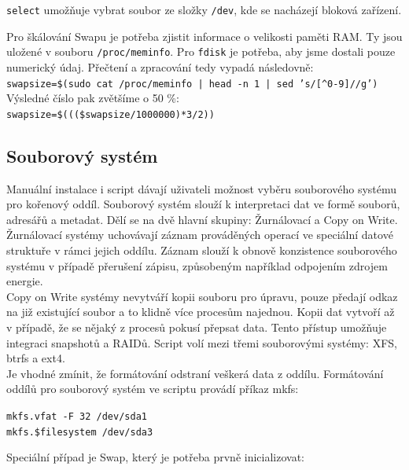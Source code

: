 \documentclass[12pt,a4paper,twoside,]{article}
\begin{document}
\texttt{select} umožňuje vybrat soubor ze složky \texttt{/dev}, kde se nacházejí bloková zařízení.
\newpage
{Pro škálování Swapu je potřeba zjistit informace o velikosti paměti RAM. Ty jsou uložené v souboru \texttt{/proc/meminfo}. Pro \texttt{fdisk} je potřeba, aby jsme dostali pouze numerický údaj. Přečtení a zpracování tedy vypadá následovně:\\
	
\texttt{swapsize=\$(sudo cat /proc/meminfo | head -n 1 | sed 's/[\^{}0-9]//g')}\\

\hspace*{-1.5em}Výsledné číslo pak zvětšíme o 50 \%:\\ 

\texttt{swapsize=\$(((\$swapsize/1000000)*3/2))}\\






\newpage
\subsection{\textsf{Souborový systém}}\hypertarget{Souborový systém}{}
Manuální instalace i script dávají uživateli možnost vyběru souborového systému pro kořenový oddíl.
Souborový systém slouží k interpretaci dat ve formě souborů, adresářů a metadat. Dělí se na dvě hlavní skupiny: Žurnálovací a Copy on Write.\\
Žurnálovací systémy uchovávají záznam prováděných operací ve speciální datové struktuře v rámci jejich oddílu. 
Záznam slouží k obnově konzistence souborového systému v případě přerušení zápisu, způsobeným například odpojením zdrojem energie. \\
Copy on Write systémy nevytváří kopii souboru pro úpravu, pouze předají odkaz na již existující soubor a to klidně více procesům najednou.
Kopii dat vytvoří až v případě, že se nějaký z procesů pokusí přepsat data. Tento přístup umožňuje integraci snapshotů a RAIDů.
Script volí mezi třemi souborovými systémy: XFS, btrfs a ext4. \\Je vhodné zmínit, že formátování odstraní veškerá data z oddílu. 
Formátování oddílů pro souborový systém ve scriptu provádí příkaz mkfs: 

\texttt{mkfs.vfat -F 32 /dev/sda1}\\
\texttt{\hspace*{1.5em}mkfs.\$filesystem /dev/sda3}

Speciální případ je Swap, který je potřeba prvně inicializovat: 

}
\end{document}
